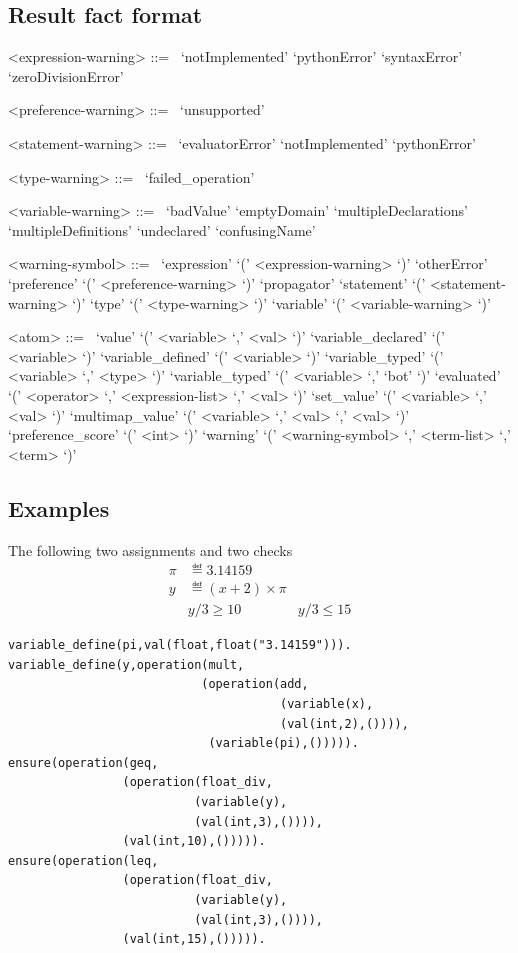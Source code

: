 \subsection{Result fact format}
\begin{grammar}

<expression-warning> ::=
~\alt `notImplemented'
\alt `pythonError'
\alt `syntaxError'
\alt `zeroDivisionError'

<preference-warning> ::=
~\alt `unsupported'

<statement-warning> ::=
~\alt `evaluatorError'
\alt `notImplemented'
\alt `pythonError'

<type-warning> ::=
~\alt `failed_operation'

<variable-warning> ::=
~\alt `badValue'
\alt `emptyDomain'
\alt `multipleDeclarations'
\alt `multipleDefinitions'
\alt `undeclared'
\alt `confusingName'

<warning-symbol> ::=
~\alt `expression' `(' <expression-warning> `)'
\alt `otherError'
\alt `preference' `(' <preference-warning> `)'
\alt `propagator'
\alt `statement' `(' <statement-warning> `)'
\alt `type' `(' <type-warning> `)'
\alt `variable' `(' <variable-warning> `)'

<atom> ::=
~\alt `value' `(' <variable> `,' <val> `)'
\alt `variable_declared' `(' <variable> `)'
\alt `variable_defined' `(' <variable> `)'
\alt `variable_typed' `(' <variable> `,' <type> `)'
\alt `variable_typed' `(' <variable> `,' `bot' `)'
\alt `evaluated' `(' <operator> `,' <expression-list>  `,' <val> `)'
\alt `set_value' `(' <variable> `,' <val> `)'
\alt `multimap_value' `(' <variable> `,' <val> `,' <val> `)'
\alt `preference_score' `(' <int> `)'
\alt `warning' `(' <warning-symbol> `,' <term-list> `,' <term> `)'
\end{grammar}

\subsection*{Examples}
The following two assignments and two checks
\begin{align*}
\pi &\eqdef 3.14159\\
y &\eqdef (x+2) \times \pi \\
& y / 3 \geq 10
& y / 3 \leq 15
\end{align*}
\begin{verbatim}
variable_define(pi,val(float,float("3.14159"))).
variable_define(y,operation(mult,
                           (operation(add,
                                      (variable(x),
                                      (val(int,2),()))),
                            (variable(pi),())))).
ensure(operation(geq,
                (operation(float_div,
                          (variable(y),
                          (val(int,3),()))),
                (val(int,10),())))).
ensure(operation(leq,
                (operation(float_div,
                          (variable(y),
                          (val(int,3),()))),
                (val(int,15),())))).
\end{verbatim}

